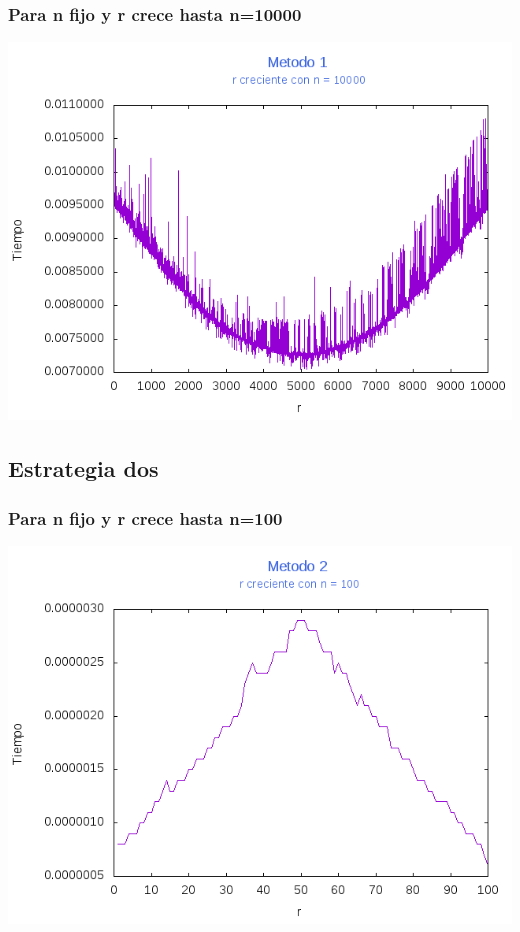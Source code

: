 \documentclass[12pt,letterpaper]{scrartcl}
\begin{document}
\subsubsection{Para n fijo y r crece hasta n=10000}
\includegraphics[scale=1]{Metodo1/plot10000m1}
\newpage
\subsection{Estrategia dos}

\subsubsection{Para n fijo y r crece hasta n=100}
\includegraphics[scale=1]{Metodo2/plot100m2}
\end{document}
